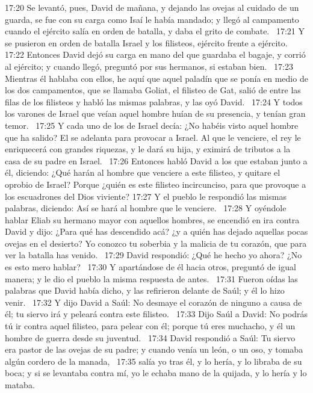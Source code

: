 17:20 Se levantó, pues, David de mañana, y dejando las ovejas al cuidado de un guarda, se fue con su carga como Isaí le había mandado; y llegó al campamento cuando el ejército salía en orden de batalla, y daba el grito de combate.  
17:21 Y se pusieron en orden de batalla Israel y los filisteos, ejército frente a ejército.  
17:22 Entonces David dejó su carga en mano del que guardaba el bagaje, y corrió al ejército; y cuando llegó, preguntó por sus hermanos, si estaban bien.  
17:23 Mientras él hablaba con ellos, he aquí que aquel paladín que se ponía en medio de los dos campamentos, que se llamaba Goliat, el filisteo de Gat, salió de entre las filas de los filisteos y habló las mismas palabras, y las oyó David.  
17:24 Y todos los varones de Israel que veían aquel hombre huían de su presencia, y tenían gran temor.  
17:25 Y cada uno de los de Israel decía: ¿No habéis visto aquel hombre que ha salido? El se adelanta para provocar a Israel. Al que le venciere, el rey le enriquecerá con grandes riquezas, y le dará su hija, y eximirá de tributos a la casa de su padre en Israel.  
17:26 Entonces habló David a los que estaban junto a él, diciendo: ¿Qué harán al hombre que venciere a este filisteo, y quitare el oprobio de Israel? Porque ¿quién es este filisteo incircunciso, para que provoque a los escuadrones del Dios viviente? 
17:27 Y el pueblo le respondió las mismas palabras, diciendo: Así se hará al hombre que le venciere.  
17:28 Y oyéndole hablar Eliab su hermano mayor con aquellos hombres, se encendió en ira contra David y dijo: ¿Para qué has descendido acá? ¿y a quién has dejado aquellas pocas ovejas en el desierto? Yo conozco tu soberbia y la malicia de tu corazón, que para ver la batalla has venido.  
17:29 David respondió: ¿Qué he hecho yo ahora? ¿No es esto mero hablar?  
17:30 Y apartándose de él hacia otros, preguntó de igual manera; y le dio el pueblo la misma respuesta de antes.  
17:31 Fueron oídas las palabras que David había dicho, y las refirieron delante de Saúl; y él lo hizo venir.  
17:32 Y dijo David a Saúl: No desmaye el corazón de ninguno a causa de él; tu siervo irá y peleará contra este filisteo.  
17:33 Dijo Saúl a David: No podrás tú ir contra aquel filisteo, para pelear con él; porque tú eres muchacho, y él un hombre de guerra desde su juventud.  
17:34 David respondió a Saúl: Tu siervo era pastor de las ovejas de su padre; y cuando venía un león, o un oso, y tomaba algún cordero de la manada,  
17:35 salía yo tras él, y lo hería, y lo libraba de su boca; y si se levantaba contra mí, yo le echaba mano de la quijada, y lo hería y lo mataba.  
